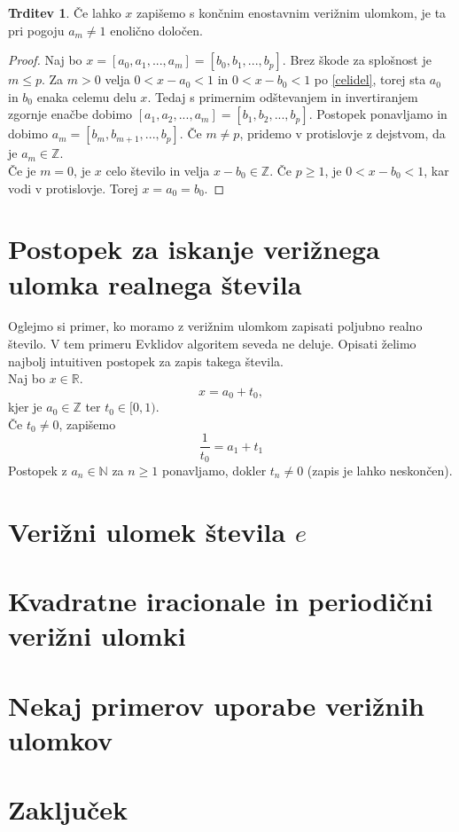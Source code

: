 \documentclass[a4paper,12pt]{article}
\newcommand{\N}{\mathbb{N}}
\newcommand{\R}{\mathbb{R}}
\newcommand{\Z}{\mathbb{Z}}
\theoremstyle{definition}
\theoremstyle{proposition}
\newtheorem{trd}{Trditev}[section]
\theoremstyle{theorem}
\theoremstyle{lemma}
\begin{document}
\begin{trd}
\label{enolicnost}
Če lahko $x$ zapišemo s končnim enostavnim verižnim ulomkom, je ta pri pogoju $a_m \neq 1$ enolično določen.
\end{trd}
\begin{proof}
Naj bo $x=[a_0, a_1, ..., a_m]=[b_0, b_1, ..., b_p]$. Brez škode za splošnost je $m\leq p$. Za $m>0$ velja $0<x-a_0<1$ in $0<x-b_0<1$ po \ref{celidel}, torej sta $a_0$ in $b_0$ enaka celemu delu $x$. Tedaj s primernim odštevanjem in invertiranjem zgornje enačbe dobimo $[a_1, a_2, ..., a_m]=[b_1, b_2, ..., b_p]$. Postopek ponavljamo in dobimo $a_m =[b_m, b_{m+1}, ..., b_p]$. Če $m \neq p$, pridemo v protislovje z dejstvom, da je $a_m \in \Z$. \\
Če je $m=0$, je $x$ celo število in velja $x-b_0 \in \Z$. Če $p\geq1$, je $0<x-b_0<1$, kar vodi v protislovje. Torej $x=a_0=b_0$. 
\end{proof}

\section{Postopek za iskanje verižnega ulomka realnega števila} \label{realna}

Oglejmo si primer, ko moramo z verižnim ulomkom zapisati poljubno realno število. V tem primeru Evklidov algoritem seveda ne deluje. Opisati želimo najbolj intuitiven postopek za zapis takega števila.\\
\vspace{5mm}
Naj bo $x \in \R$.\\
\[ x = a_0+t_0, \]
kjer je $a_0 \in \Z$ ter $t_0 \in [0,1)$.\\
Če $t_0 \neq 0$, zapišemo \[ \frac{1}{t_0} = a_1 + t_1 \]
Postopek z $a_n \in \N$ za $n \geq 1$ ponavljamo, dokler $t_n \neq 0$ (zapis je lahko neskončen).



\section{Verižni ulomek števila $e$} \label{euler}

\section{Kvadratne iracionale in periodični verižni ulomki} \label{periode}

\section{Nekaj primerov uporabe verižnih ulomkov} \label{uporaba}

\section{Zaključek}
\end{document}
